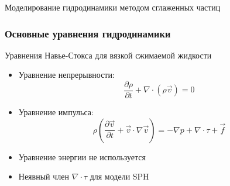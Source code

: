 \begin{frame}
    \begin{center}
        \Huge
        Моделирование гидродинамики методом сглаженных частиц
    \end{center}
\end{frame}

\begin{frame}
    \frametitle{Основные уравнения гидродинамики}

    Уравнения Навье-Стокса для вязкой сжимаемой жидкости
    \begin{itemize}
        \item Уравнение непрерывности:
        \begin{equation}
            \frac{\partial \rho}{\partial t} + \nabla \cdot (\rho \vec{v}) = 0
        \end{equation}
        \item Уравнение импульса:
        \begin{equation}
            \rho \left( \frac{\partial \vec{v}}{\partial t} + \vec{v} \cdot \nabla \vec{v} \right)
                = -\nabla p + \nabla \cdot \tau + \vec{f}
        \end{equation}
        \item Уравнение энергии не используется
        \item Неявный член $\nabla \cdot \tau$ для модели SPH
    \end{itemize}
\end{frame}


